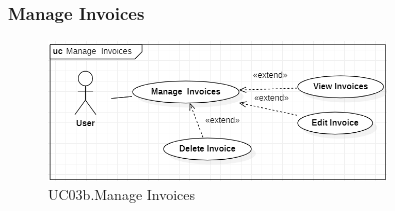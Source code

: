 \documentclass[../thesis.tex]{subfiles}
\begin{document}
\subsubsection{Manage Invoices}
\begin{figure}[H]
    \centering
    \includegraphics[width=0.8\textwidth]{images/UCD_ManageInvoices.png}
    \caption{UC03b.Manage Invoices}
    \label{fig:UCD-manage-invoices}
\end{figure}
\end{document}
